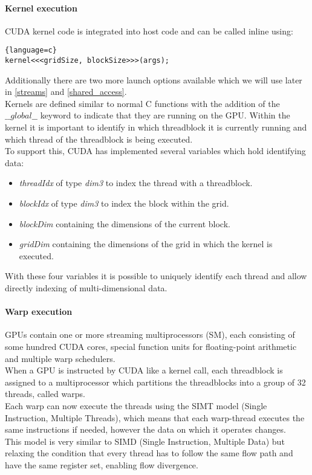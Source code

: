 \paragraph{Kernel execution}
CUDA kernel code is integrated into host code and can be called inline using:
\begin{lstlisting}{language=c}
kernel<<<gridSize, blockSize>>>(args);
\end{lstlisting}
Additionally there are two more launch options available which we will use later in \ref{streams} and \ref{shared_access}.\\
Kernels are defined similar to normal C functions with the addition of the $ \_\_global\_\_ $ keyword to indicate that they are running on the GPU.
Within the kernel it is important to identify in which threadblock it is currently running and 
which thread of the threadblock is being executed.\\
To support this, CUDA has implemented several variables which hold identifying data:\\
\begin{itemize}
    \item \emph{threadIdx} of type \emph{dim3} to index the thread with a threadblock.
    \item \emph{blockIdx} of type \emph{dim3} to index the block within the grid.
    \item \emph{blockDim} containing the dimensions of the current block.
    \item \emph{gridDim} containing the dimensions of the grid in which the kernel is executed.
\end{itemize}
With these four variables it is possible to uniquely identify each thread and allow directly indexing of multi-dimensional data.\\
\paragraph{Warp execution}
GPUs contain one or more streaming multiprocessors (SM), each consisting of some hundred CUDA cores, special function units for floating-point arithmetic and multiple warp schedulers.\\
When a GPU is instructed by CUDA like a kernel call, each threadblock is assigned to a multiprocessor which partitions the threadblocks into a group of 32 threads, called warps.\\
Each warp can now execute the threads using the SIMT model (Single Instruction, Multiple Threads),
which means that each warp-thread executes the same instructions if needed, however the data on which it operates changes.\\
This model is very similar to SIMD (Single Instruction, Multiple Data) but relaxing the condition that every thread has to follow the same flow path and have the same register set, enabling flow divergence.\\
